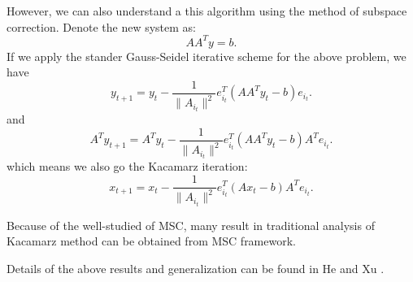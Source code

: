 However, we can also understand a this algorithm using the method of subspace correction. Denote the new system as:
\begin{equation}\label{eq:KacamarzLinear}
AA^T y = b.
\end{equation}
If we apply the stander Gauss-Seidel iterative scheme for the above problem, we have 
\begin{equation}\label{eq:G-SKaca}
y_{t+1} = y_t -  \frac{1}{\|A_{i_t}\|^2}e_{i_t}^T(AA^Ty_t - b) e_{i_t}. 
\end{equation}
and 
$$
A^Ty_{t+1} =A^T y_t -  \frac{1}{\|A_{i_t}\|^2}e_{i_t}^T(AA^Ty_t - b) A^Te_{i_t}. 
$$
which means we also go the Kacamarz iteration:
$$
x_{t+1} =x_t -  \frac{1}{\|A_{i_t}\|^2}e_{i_t}^T(Ax_t - b) A^Te_{i_t}. 
$$

Because of the well-studied of MSC, many result in traditional
analysis of Kacamarz method can be obtained from MSC framework.

Details of the above results and generalization can be found in He and
Xu \cite{he2018iterative}.

